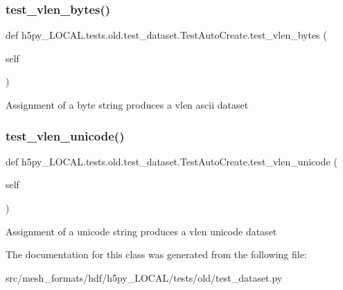 \subsubsection{\texorpdfstring{test\+\_\+vlen\+\_\+bytes()}{test\_vlen\_bytes()}}
{\footnotesize\ttfamily def h5py\+\_\+\+L\+O\+C\+A\+L.\+tests.\+old.\+test\+\_\+dataset.\+Test\+Auto\+Create.\+test\+\_\+vlen\+\_\+bytes (\begin{DoxyParamCaption}\item[{}]{self }\end{DoxyParamCaption})}

\begin{DoxyVerb}Assignment of a byte string produces a vlen ascii dataset \end{DoxyVerb}
 \mbox{\label{classh5py__LOCAL_1_1tests_1_1old_1_1test__dataset_1_1TestAutoCreate_a32ae28e6c41cb9a83e6acf019afb9b53}} 
\subsubsection{\texorpdfstring{test\+\_\+vlen\+\_\+unicode()}{test\_vlen\_unicode()}}
{\footnotesize\ttfamily def h5py\+\_\+\+L\+O\+C\+A\+L.\+tests.\+old.\+test\+\_\+dataset.\+Test\+Auto\+Create.\+test\+\_\+vlen\+\_\+unicode (\begin{DoxyParamCaption}\item[{}]{self }\end{DoxyParamCaption})}

\begin{DoxyVerb}Assignment of a unicode string produces a vlen unicode dataset \end{DoxyVerb}
 

The documentation for this class was generated from the following file\+:\begin{DoxyCompactItemize}
\item 
src/mesh\+\_\+formats/hdf/h5py\+\_\+\+L\+O\+C\+A\+L/tests/old/test\+\_\+dataset.\+py\end{DoxyCompactItemize}
